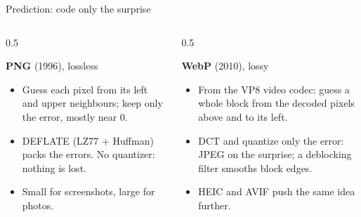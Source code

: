 \documentclass[aspectratio=169]{beamer}
\begin{document}
\begin{frame}{Prediction: code only the surprise}
  \begin{columns}[T]
    \begin{column}{0.5\textwidth}
      \begin{center}
      \end{center}
      \textbf{PNG} (1996), lossless \cite{boutell1997}
      \begin{itemize}
        \item Guess each pixel from its left and upper neighbours; keep only the error, mostly near $0$.
        \item DEFLATE (LZ77 + Huffman) packs the errors. No quantizer: nothing is lost.
        \item Small for screenshots, large for photos.
      \end{itemize}
    \end{column}
    \begin{column}{0.5\textwidth}
      \begin{center}
      \end{center}
      \textbf{WebP} (2010), lossy \cite{bankoski2011,zern2024}
      \begin{itemize}
        \item From the VP8 video codec: guess a whole block from the decoded pixels above and to its left.
        \item DCT and quantize only the error: JPEG on the surprise; a deblocking filter smooths block edges.
        \item HEIC and AVIF push the same idea further.
      \end{itemize}
    \end{column}
  \end{columns}
\end{frame}
\end{document}
